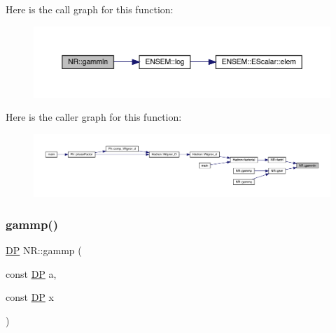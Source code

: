 Here is the call graph for this function\+:
\nopagebreak
\begin{figure}[H]
\begin{center}
\leavevmode
\includegraphics[width=350pt]{da/d46/namespaceNR_aedefa334aaa11250391e7bb4867dc7d5_cgraph}
\end{center}
\end{figure}
Here is the caller graph for this function\+:
\nopagebreak
\begin{figure}[H]
\begin{center}
\leavevmode
\includegraphics[width=350pt]{da/d46/namespaceNR_aedefa334aaa11250391e7bb4867dc7d5_icgraph}
\end{center}
\end{figure}
\mbox{\label{namespaceNR_ad617f7290581d8abbf35fb5e8206ffc8}} 
\subsubsection{\texorpdfstring{gammp()}{gammp()}}
{\footnotesize\ttfamily \mbox{\hyperlink{namespaceNR_af6ff762dd605ff477b8e52387253a02a}{DP}} N\+R\+::gammp (\begin{DoxyParamCaption}\item[{const \mbox{\hyperlink{namespaceNR_af6ff762dd605ff477b8e52387253a02a}{DP}}}]{a,  }\item[{const \mbox{\hyperlink{namespaceNR_af6ff762dd605ff477b8e52387253a02a}{DP}}}]{x }\end{DoxyParamCaption})}

